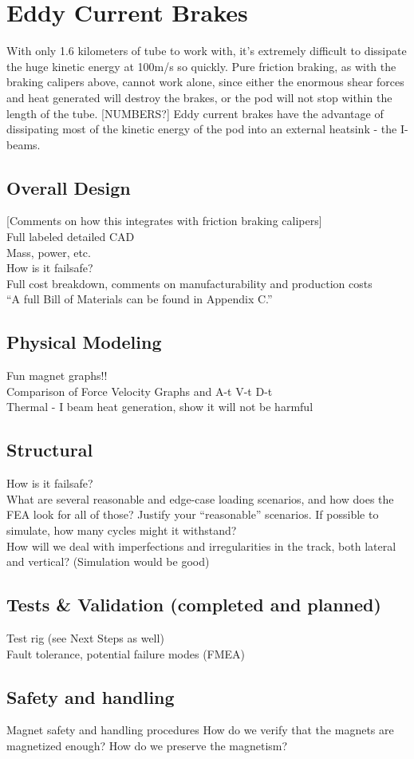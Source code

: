 \documentclass[main.tex]{subfiles}
\begin{document}
    \section{Eddy Current Brakes}
    With only 1.6 kilometers of tube to work with, it’s extremely difficult to dissipate the huge kinetic energy at 100m/s so quickly. Pure friction braking, as with the braking calipers above, cannot work alone, since either the enormous shear forces and heat generated will destroy the brakes, or the pod will not stop within the length of the tube. [NUMBERS?] Eddy current brakes have the advantage of dissipating most of the kinetic energy of the pod into an external heatsink - the I-beams.

    \subsection{Overall Design}
    [Comments on how this integrates with friction braking calipers]\\
    Full labeled detailed CAD\\
    Mass, power, etc.\\
    How is it failsafe?\\
    Full cost breakdown, comments on manufacturability and production costs\\
    “A full Bill of Materials can be found in Appendix C.”

    \subsection{Physical Modeling}
    Fun magnet graphs!!\\
    Comparison of Force Velocity Graphs and A-t V-t D-t\\
    Thermal - I beam heat generation, show it will not be harmful

    \subsection{Structural}
    How is it failsafe?\\
    What are several reasonable and edge-case loading scenarios, and how does the FEA look for all of those? Justify your “reasonable” scenarios. If possible to simulate, how many cycles might it withstand?\\
    How will we deal with imperfections and irregularities in the track, both lateral and vertical? (Simulation would be good)

    \subsection{Tests \& Validation (completed and planned)}
    Test rig (see Next Steps as well)\\
    Fault tolerance, potential failure modes (FMEA)

    \subsection{Safety and handling}
    Magnet safety and handling procedures
    How do we verify that the magnets are magnetized enough? How do we preserve the magnetism?
\end{document}
